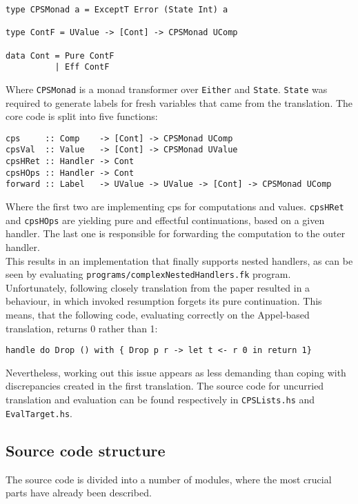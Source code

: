 \documentclass{article}
\theoremstyle{definition}
\theoremstyle{lemma}
\theoremstyle{observation}
\theoremstyle{theorem}
\begin{document}
    \begin{verbatim}
type CPSMonad a = ExceptT Error (State Int) a

type ContF = UValue -> [Cont] -> CPSMonad UComp

data Cont = Pure ContF
          | Eff ContF
    \end{verbatim}
    Where \verb!CPSMonad! is a monad transformer over \verb!Either! and \verb!State!.
    \verb!State! was required to generate labels for fresh variables that
    came from the translation. The core code is split into five functions:

    \begin{verbatim}
cps     :: Comp    -> [Cont] -> CPSMonad UComp
cpsVal  :: Value   -> [Cont] -> CPSMonad UValue
cpsHRet :: Handler -> Cont
cpsHOps :: Handler -> Cont
forward :: Label   -> UValue -> UValue -> [Cont] -> CPSMonad UComp
    \end{verbatim}
    Where the first two are implementing cps for computations and values.
    \verb!cpsHRet! and \verb!cpsHOps! are yielding pure and effectful continuations,
    based on a given handler. The last one is responsible for forwarding the
    computation to the outer handler.\\

    This results in an implementation that finally supports nested handlers,
    as can be seen by evaluating \verb!programs/complexNestedHandlers.fk! program.
    Unfortunately, following closely translation from the paper resulted in
    a behaviour, in which invoked resumption forgets its pure continuation. This means,
    that the following code, evaluating correctly on the Appel-based translation,
    returns 0 rather than 1:

    \begin{verbatim}
handle do Drop () with { Drop p r -> let t <- r 0 in return 1}
    \end{verbatim}
    Nevertheless, working out this issue appears as less demanding than coping with
    discrepancies created in the first translation. The source code for uncurried
    translation and evaluation can be found respectively in \verb!CPSLists.hs! and
    \verb!EvalTarget.hs!.

    \subsection{Source code structure}

    The source code is divided into a number of modules, where the most
    crucial parts have already been described.
\end{document}
